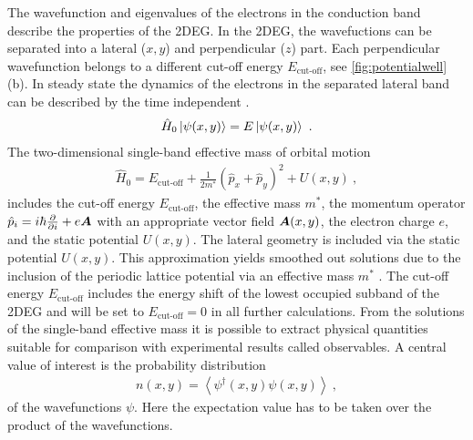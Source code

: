 The wavefunction and eigenvalues of the electrons in the conduction band describe the properties of the 2DEG. In the 2DEG, the wavefuctions can be separated into a lateral ($x,y$) and perpendicular ($z$) part. Each perpendicular wavefunction belongs to a different cut-off energy $E_{\text{cut-off}}$, see \cref{fig:potentialwell}(b).
In steady state the dynamics of the electrons in the separated lateral band can be described by the time independent \sdg{}.
\begin{align}
 \hat{H}_0\left| \psi(x,y) \right> = E \left| \psi(x,y) \right>\ .
	\label{eqn:effectivemasssdg}
\end{align}
The two-dimensional single-band effective mass \hamil{} of orbital motion
\begin{align}
\hat{H}_0 = E_{\text{cut-off}} + \frac{1}{2m^*}(\hat{p}_{x}+\hat{p}_{y})^2+U(x,y)\ ,
\end{align}
includes the cut-off energy $E_{\text{cut-off}}$, the effective mass $m^*$, the momentum operator $\hat{p}_i = i\hbar \frac{\partial }{\partial i} + e\boldsymbol{A}$ with an appropriate vector field $\boldsymbol{A}(x,y)$, the electron charge $e$, and the static potential $U(x,y)$.
The lateral geometry is included via the static potential $U(x,y)$.
This approximation yields smoothed out solutions due to the inclusion of the periodic lattice potential via an effective mass $m^*$ \cite{BastardBrum1986}.
The cut-off energy $E_{\text{cut-off}}$ includes the energy shift of the lowest occupied subband of the 2DEG and will be set to $E_{\text{cut-off}} = 0$ in all further calculations.
From the solutions of the single-band effective mass \sdg{} it is possible to extract physical quantities suitable for comparison with experimental results called observables.
A central value of interest is the probability distribution
\begin{align}
	n(x,y) = \left< \psi^{\dagger} (x,y) \psi(x,y)\right>\ ,
	\label{eqn:analyticalelectrondensity}
\end{align}
of the wavefunctions $\psi$. Here the expectation value has to be taken over the product of the wavefunctions.\par

